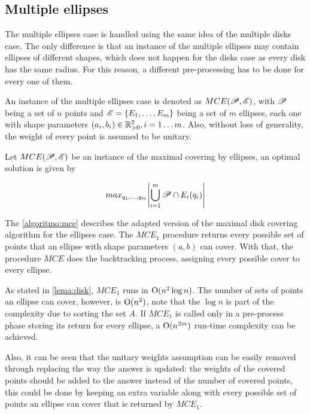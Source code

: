 \subsection{Multiple ellipses}

The multiple ellipses case is handled using the same idea of the multiple disks case. The only difference is that an instance of the multiple ellipses may contain ellipses of different shapes, which does not happen for the disks case as every disk has the same radius. For this reason, a different pre-processing has to be done for every one of them.

An instance of the multiple ellipses case is denoted as $MCE(\mathscr{P}, \mathscr{E})$, with $\mathscr{P}$ being a set of $n$ points and $\mathscr{E} = \{E_1, \dots, E_m\}$ being a set of $m$ ellipses, each one with shape parameters $(a_i, b_i) \in \mathbb{R}^2_{>0}, i = 1 \dots m$. Also, without loss of generality, the weight of every point is assumed to be unitary.

\begin{definicao}
Let $MCE(\mathscr{P}, \mathscr{E})$ be an instance of the maximal covering by ellipses, an optimal solution is given by

\begin{equation}
    max_{q_1, \dots, q_m}{\left|\bigcup_{i=1}^{m} \mathscr{P} \cap E_i(q_i)\right|}
\end{equation}
\end{definicao}

The \autoref{algoritmo:mce} describes the adapted version of the maximal disk covering algorithm for the ellipses case. The $MCE_1$ procedure returns every possible set of points that an ellipse with shape parameters $(a,b)$ can cover. With that, the procedure $MCE$ does the backtracking process, assigning every possible cover to every ellipse.

As stated in \autoref{lema:disk}, $MCE_1$ runs in $\mathrm{O}(n^2\log{n})$. The number of sets of points an ellipse can cover, however, is $\mathrm{O}(n^2)$, note that the $\log{n}$ is part of the complexity due to sorting the set $A$. If $MCE_1$ is called only in a pre-process phase storing its return for every ellipse, a $\mathrm{O}(n^{2m})$ run-time complexity can be achieved. 

Also, it can be seen that the unitary weights assumption can be easily removed through replacing the way the answer is updated: 
the weights of the covered points should be added to the answer instead of the number of covered points, this could be done by keeping an extra variable along with every possible set of points an ellipse can cover that is returned by $MCE_1$.

